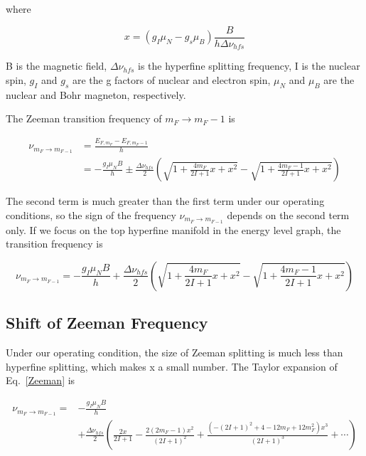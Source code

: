 where

\begin{equation}
x=(g_{I}\mu_{N}-g_{s}\mu_{B})\frac{B}{h\Delta \nu_{hfs}}
\end{equation}

B is the magnetic field, $\Delta \nu_{hfs}$ is the hyperfine splitting frequency, I is the nuclear spin, $g_{I}$ and $g_{s}$ are the g factors of nuclear and electron spin, $\mu_{N}$ and $\mu_{B}$ are the nuclear and Bohr magneton, respectively. 

The Zeeman transition frequency of $m_{F} \rightarrow m_{F} - 1$ is 

\begin{equation}
\begin{split}
\nu_{m_{F}\rightarrow m_{F-1}} &=\frac{E_{F,m_{F}}-E_{F,m_{F}-1}}{h} \\
&= -\frac{g_{I}\mu_{N}B}{h}\pm \frac{\Delta \nu_{hfs}}{2}\left(\sqrt{1+\frac{4m_{F}}{2I+1}x+x^{2}}-\sqrt{1+\frac{4m_{F}-1}{2I+1}x+x^{2}}\right)
\end{split}
\end{equation}

The second term is much greater than the first term under our operating conditions, so the sign of the frequency $\nu_{m_{F}\rightarrow m_{F-1}}$ depends on the second term only. If we focus on the top hyperfine manifold in the energy level graph, the transition frequency is

\begin{equation}\label{Zeeman}
\nu_{m_{F}\rightarrow m_{F-1}} = -\frac{g_{I}\mu_{N}B}{h}+ \frac{\Delta \nu_{hfs}}{2}\left(\sqrt{1+\frac{4m_{F}}{2I+1}x+x^{2}}-\sqrt{1+\frac{4m_{F}-1}{2I+1}x+x^{2}}\right)
\end{equation}

\subsection{Shift of Zeeman Frequency}

Under our operating condition, the size of Zeeman splitting is much less than hyperfine splitting, which makes x a small number. The Taylor expansion of Eq.~\ref{Zeeman} is

\begin{equation}\label{Taylorwithx}
\begin{split}
\nu_{m_{F}\rightarrow m_{F-1}}=&-\frac{g_{I}\mu_{N}B}{h}\\
&+\frac{\Delta\nu_{hfs}}{2}\left(\frac{2x}{2I+1}-\frac{2(2m_{F}-1)x^{2}}{(2I+1)^{2}}+\frac{(-(2I+1)^{2}+4-12m_{F}+12m_{F}^{2})x^{3}}{(2I+1)^{3}}+\cdots\right)
\end{split}
\end{equation}
 
